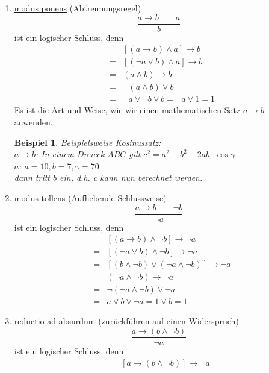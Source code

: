 \documentclass{report}
\newtheorem{myexample}{Beispiel}
\begin{document}
\begin{enumerate}
\item \underline{modus ponens} (Abtrennungsregel)
\begin{equation}\frac{a \to b \quad\quad a}{b}\end{equation}
ist ein logischer Schluss, denn
\begin{eqnarray}& &[(a \to b) \land a] \to b \nonumber \\
&=&[(\lnot a \lor b) \land a] \to b \nonumber \\
&=&(a \land b) \to b \nonumber \\
&=&\lnot (a \land b) \lor b \nonumber \\
&=&\lnot a \lor \lnot b \lor b = \lnot a \lor 1 = 1\end{eqnarray}
Es ist die Art und Weise, wie wir einen mathematischen Satz $a \to b$ anwenden.
\begin{myexample}Beispielsweise Kosinussatz:\\
$a \to b$: In einem Dreieck $ABC$ gilt $c^2 = a^2 + b^2 - 2ab \cdot \cos{\gamma}$ \\
$a$: $a=10, b=7, \gamma = 70$\\
dann tritt $b$ ein, d.h. c kann nun berechnet werden.\end{myexample}
\item \underline{modus tollens} (Aufhebende Schlussweise)
\begin{equation}\frac{a \to b \quad\quad \lnot b}{\lnot a}\end{equation}
ist ein logischer Schluss, denn
\begin{eqnarray}& &[(a \to b) \land \lnot b] \to \lnot a \nonumber \\
&=&[(\lnot a \lor b) \land \lnot b] \to \lnot a \nonumber \\
&=&[(b \land \lnot b) \lor (\lnot a \land \lnot b)] \to \lnot a \nonumber \\
&=&(\lnot a \land \lnot b) \to \lnot a \nonumber \\
&=&\lnot (\lnot a \land \lnot b) \lor \lnot a \nonumber \\
&=&a \lor b \lor \lnot a = 1 \lor b = 1\end{eqnarray}
\item \underline{reductio ad absurdum} (zurückführen auf einen Widerspruch)
\begin{equation} \frac{a \to (b \land \lnot b)}{\lnot a}\end{equation}
ist ein logischer Schluss, denn
\begin{eqnarray}& &[a \to (b \land \lnot b)] \to \lnot a \nonumber \\

\end{eqnarray}
\end{enumerate}
\end{document}
